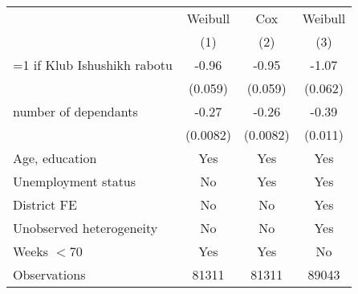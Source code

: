 \begin{tabular}{l*{3}{c}}
\toprule
                &\multicolumn{1}{c}{Weibull}&\multicolumn{1}{c}{Cox}&\multicolumn{1}{c}{Weibull}\\
                \cmidrule{2-4}
                \scriptsize{ & (1) & (2) & (3)} \\
\midrule

=1 if Klub Ishushikh rabotu&    -0.96&    -0.95&    -1.07\\
                &  (0.059)&  (0.059)&  (0.062)\\
\addlinespace
number of dependants&    -0.27&    -0.26&    -0.39\\
                & (0.0082)& (0.0082)&  (0.011)\\

\midrule
Age, education & Yes & Yes & Yes \\
Unemployment status & No & Yes & Yes \\
District FE & No & No & Yes \\
Unobserved heterogeneity & No & No & Yes \\
Weeks $< 70$ & Yes & Yes & No \\
\midrule
Observations    &    81311&    81311&    89043\\
\bottomrule
\end{tabular}
